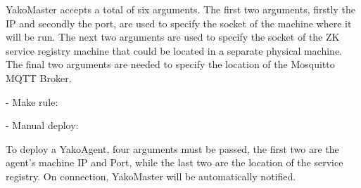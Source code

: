 
            YakoMaster accepts a total of six arguments. The first two arguments, firstly the IP and secondly the port, are used to specify the socket of the machine where it will be run. The next two arguments are used to specify the socket of the ZK service registry machine that could be located in a separate physical machine. The final two arguments are needed to specify the location of the Mosquitto MQTT Broker.
    
            - Make rule:
            
            
            - Manual deploy:
            

            To deploy a YakoAgent, four arguments must be passed, the first two are the agent's machine IP and Port, while the last two are the location of the service registry. On connection, YakoMaster will be automatically notified.
            
